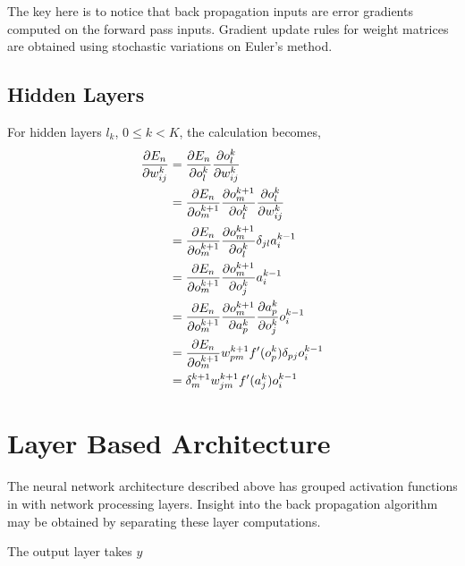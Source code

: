 \documentclass[12pt,notitlepage]{article}
\begin{document}
The key here is to notice that back propagation inputs are error
gradients computed on the forward pass inputs.  Gradient update rules for
weight matrices are obtained using stochastic variations on Euler's method.
\subsection{Hidden Layers}
\label{sec:hidden-layers}

For hidden layers $l_{k}$, $0 \le k < K$, the calculation becomes,
\begin{equation}
  \label{eq:error-grad-hidden}
  \begin{split}
    \frac{\partial E_{n}}{\partial w^{k}_{ij}} &=
    \frac{\partial E_{n}}{\partial o_{l}^{k}}\frac{\partial o_{l}^{k}}{\partial w_{ij}^{k}}\\
    &=
    \frac{\partial E_{n}}{\partial o_{m}^{k+1}}\frac{\partial o_{m}^{k+1}}{\partial o_{l}^{k}}\frac{\partial o_{l}^{k}}{\partial w_{ij}^{k}}\\
    &=
    \frac{\partial E_{n}}{\partial o_{m}^{k+1}}\frac{\partial o_{m}^{k+1}}{\partial o_{l}^{k}}\delta_{jl}a_{i}^{k-1}\\
    &=
    \frac{\partial E_{n}}{\partial o_{m}^{k+1}}\frac{\partial o_{m}^{k+1}}{\partial o_{j}^{k}}a_{i}^{k-1}\\
    &=
    \frac{\partial E_{n}}{\partial o_{m}^{k+1}}\frac{\partial o_{m}^{k+1}}{\partial a_{p}^{k}}\frac{\partial a_{p}^{k}}{\partial o_{j}^{k}}o_{i}^{k-1}\\ 
    &=
    \frac{\partial E_{n}}{\partial o_{m}^{k+1}}w_{pm}^{k+1}f'(o_{p}^{k})\delta_{pj}o_{i}^{k-1}\\ 
    &= \delta^{k+1}_{m}w_{jm}^{k+1}f'(a_{j}^{k})o_{i}^{k-1}\\
  \end{split}
\end{equation}

\section{Layer Based Architecture}
\label{sec:layer-arch}
The neural network architecture described above has grouped activation
functions in with network processing layers.  Insight into the back
propagation algorithm may be obtained by separating these layer
computations.

The output layer takes $y$
\end{document}
